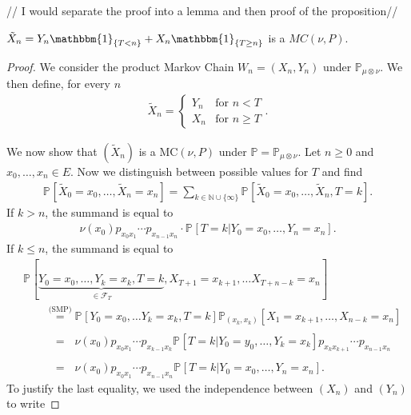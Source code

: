 {\color{blue} // I would separate the proof into a lemma and then proof of the proposition//
\begin{lemma}[]
	$\tilde{X}_n = Y_n \mathbbm{1}_{\{T<n\}} + X_n \mathbbm{1}_{\{T \geq n\}} $ is a $MC(\nu, P)$.
\end{lemma}
\begin{proof}
	We consider the product Markov Chain $W_n = (X_n, Y_n)$ under $\mathbb{P}_{\mu \otimes \nu}$. We then define, for every $n$ 
	\begin{align}
		\tilde{X}_n =
	\begin{cases}
		Y_n & \textrm{for } n < T \\
		X_n & \textrm{for } n \geq T
	\end{cases}
	.\end{align}

We now show that $(\tilde{X}_n)$ is a MC$(\nu, P)$ under $\mathbb{P} = \mathbb{P}_{\mu \otimes \nu}$. Let $n\geq 0$ and $x_0, \ldots, x_n \in E$. Now we distinguish between possible values for $T$ and find
\begin{align}
	\mathbb{P}_{} \left[ \tilde{X}_0 = x_0, \ldots , \tilde{X}_n = x_n \right] = \sum_{k \in \mathbb{N} \cup \{\infty\}}^{} \mathbb{P}_{} \left[ \tilde{X}_0 = x_0, \ldots , \tilde{X}_n , T=k \right] .
\end{align}
If $k>n$, the summand is equal to 
\begin{align}
	\nu (x_0) p_{x_0x_1}\cdots p_{x_{n-1}x_n} \cdot \mathbb{P}_{} \left[ T=k | Y_0 = x_0, \ldots , Y_n=x_n \right].
\end{align}
If $k \leq n$, the summand is equal to
\begin{align}
	&\mathbb{P}_{} \left[ \underbrace{Y_0=x_0, \ldots , Y_k=x_k,T=k}_{\in \mathcal{F}_T},X_{T+1}=x_{k+1}, \ldots X_{T+n-k}=x_n \right]  \\
	&\qquad \stackrel{\textrm{(SMP)}}{=} \mathbb{P}_{} \left[ Y_0=x_0, \ldots Y_k=x_k, T=k \right] \mathbb{P}_{(x_k, x_k)} \left[ X_1=x_{k+1}, \ldots , X_{n-k}=x_n \right]  \\
	&\qquad \stackrel{\phantom{\textrm{(SMP)}}}{=} \nu (x_0) p_{x_0x_1}\cdots p_{x_{k-1}x_k} \mathbb{P}_{} \left[ T=k | Y_0 = y_0, \ldots, Y_k=x_k \right] p_{x_k x_{k+1}} \cdots p_{x_{n-1}x_n}  \\
	&\qquad \stackrel{\phantom{\textrm{(SMP)}}}{=} \nu (x_0) p_{x_0 x_1} \cdots p_{x_{n-1}x_n} \mathbb{P}_{} \left[ T=k | Y_0=x_0, \ldots, Y_n=x_n \right]  .
\end{align}
To justify the last equality, we used the independence between $(X_n)$ and $(Y_n)$ to write

\end{proof}}
